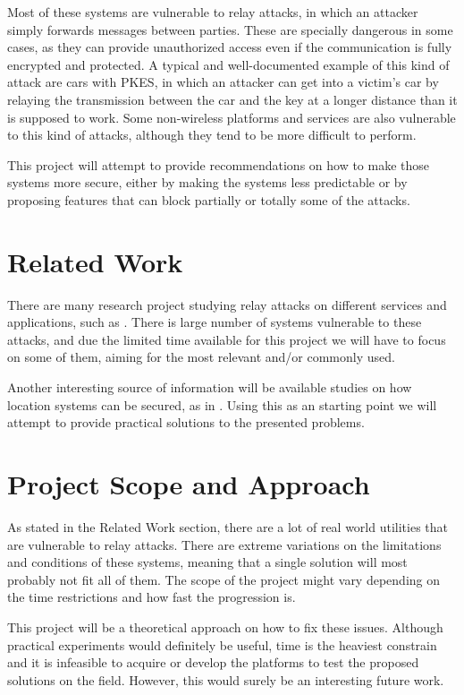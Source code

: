 \documentclass{article}
\begin{document}
Most of these systems are vulnerable to relay attacks, in which an attacker simply forwards messages between parties. These are specially dangerous in some cases, as they can provide unauthorized access even if the communication is fully encrypted and protected. A typical and well-documented example of this kind of attack are cars with PKES, in which an attacker can get into a victim's car by relaying the transmission between the car and the key at a longer distance than it is supposed to work. Some non-wireless platforms and services are also vulnerable to this kind of attacks, although they tend to be more difficult to perform.

This project will attempt to provide recommendations on how to make those systems more secure, either by making the systems less predictable or by proposing features that can block partially or totally some of the attacks.

\section{Related Work}
There are many research project studying relay attacks on different services and applications, such as \cite{carentry, contactless}. There is large number of systems vulnerable to these attacks, and due the limited time available for this project we will have to focus on some of them, aiming for the most relevant and/or commonly used.

Another interesting source of information will be available studies on how location systems can be secured, as in \cite{securepos}. Using this as an starting point we will attempt to provide practical solutions to the presented problems.

\section{Project Scope and Approach}
As stated in the Related Work section, there are a lot of real world utilities that are vulnerable to relay attacks. There are extreme variations on the limitations and conditions of these systems, meaning that a single solution will most probably not fit all of them. The scope of the project might vary depending on the time restrictions and how fast the progression is.

This project will be a theoretical approach on how to fix these issues. Although practical experiments would definitely be useful, time is the heaviest constrain and it is infeasible to acquire or develop the platforms to test the proposed solutions on the field. However, this would surely be an interesting future work.
\end{document}
